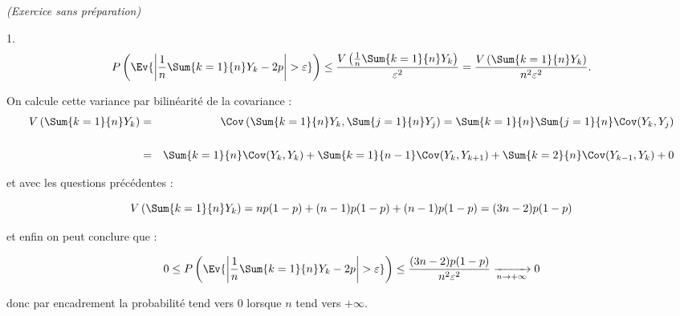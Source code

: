 \documentclass[11pt]{article}%
\begin{document}
\begin{exercice}{\it (Exercice sans préparation)}
\begin{noliste}{1.}
\[
 P \left(\Ev{ \left| \frac{1}{n} \Sum{k = 1}{n} Y_{k} - 2 p \right| >
\varepsilon}\right) \leq \frac{ V \left( \frac{1}{n} \Sum{k = 1}{n}
Y_{k} \right) }{ \varepsilon^{2} } = \frac{ V \left( \Sum{k = 1}{n}
Y_{k} \right) }{ n^{2} \varepsilon^{2} }. 
\]

 On calcule cette variance par bilinéarité de la covariance : 
 \begin{eqnarray*}
   V \left( \Sum{k = 1}{n} Y_{k} \right) & = & \Cov \left( \Sum{k = 1}{n}
     Y_{k}, \Sum{j = 1}{n} Y_{j} \right) = \Sum{k = 1}{n} \Sum{j = 1}{n}
   \Cov ( Y_{k}, Y_{j} ) \\
   \\
   & = & \Sum{k = 1}{n} \Cov ( Y_{k}, Y_{k} ) + \Sum{k = 1}{n-1} \Cov (
   Y_{k}, Y_{k + 1} ) + \Sum{k = 2}{n} \Cov ( Y_{k-1}, Y_{k} ) + 0 
 \end{eqnarray*}

 et avec les questions précédentes : 
 
\[
 V \left( \Sum{k = 1}{n} Y_{k} \right) = n p (1-p) + (n-1) p (1-p) +
(n-1) p (1-p) = (3n-2) p (1-p ) 
\]

 et enfin on peut conclure que : 
 
\[
 0 \leq P \left(\Ev{ \left| \frac{1}{n} \Sum{k = 1}{n} Y_{k} - 2 p
\right| > \varepsilon}\right) \leq \frac{ (3n-2) p (1-p) }{ n^{2}
\varepsilon^{2} } \xrightarrow[ n \rightarrow + \infty ]{} 0 
\]

 donc par encadrement la probabilité tend vers 0 lorsque $n$ tend vers
$ + \infty$. \\

 \end{noliste}
 \end{exercice}

 \newpage
\end{document}
